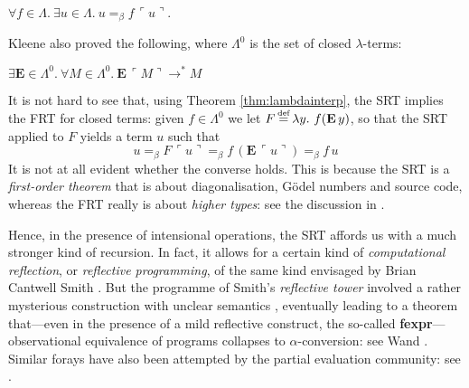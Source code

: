 \documentclass[11pt]{entcs}
\newcommand{\defeq}{\stackrel{\mathclap{\mbox{\tiny def}}}{=}}
\begin{document}
\begin{thm}
  $\forall f \in \Lambda.\
  \exists u \in \Lambda.\
    u =_\beta f \, \ulcorner u \urcorner$.
\end{thm}

\noindent Kleene also proved the following, where $\Lambda^0$ is
the set of closed $\lambda$-terms:

\begin{thm}
  \label{thm:lambdainterp}
  $\exists \mathbf{E} \in \Lambda^0.\
  \forall M \in \Lambda^0.\
  \mathbf{E} \, \ulcorner M \urcorner \rightarrow^\ast M$
\end{thm}

\noindent It is not hard to see that, using Theorem
\ref{thm:lambdainterp}, the SRT implies the FRT for closed terms:
given $f \in \Lambda^0$ we let $F \defeq \lambda y.\ f
(\mathbf{E}\,y)$, so that the SRT applied to $F$ yields a term $u$
such that \[
  u =_\beta F \, \ulcorner u \urcorner
    =_\beta f \, (\mathbf{E}\,\ulcorner u \urcorner)
    =_\beta f \, u
\]
It is not at all evident whether the converse holds. This is
because the SRT is a \emph{first-order theorem} that is about
diagonalisation, G\"odel numbers and source code, whereas the FRT
really is about \emph{higher types}: see the discussion in
\cite[\S 2]{Kavvos2017}.

Hence, in the presence of intensional operations, the SRT affords
us with a much stronger kind of recursion. In fact, it allows for
a certain kind of \emph{computational reflection}, or
\emph{reflective programming}, of the same kind envisaged by Brian
Cantwell Smith \cite{Smith1984}. But the programme of Smith's
\emph{reflective tower} involved a rather mysterious construction
with unclear semantics \cite{Friedman1984,Wand1988,Danvy1988},
eventually leading to a theorem that---even in the presence of a
mild reflective construct, the so-called
\textbf{fexpr}---observational equivalence of programs collapses
to $\alpha$-conversion: see Wand \cite{Wand1998}. Similar forays
have also been attempted by the partial evaluation community: see
\cite{Hansen1989,Jones1992,Jones2013}.
\end{document}

